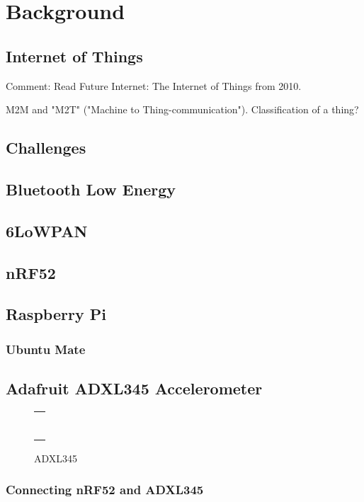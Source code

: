 \chapter{Background}
\label{chp:background} 


\section{Internet of Things}

Comment: Read Future Internet: The Internet of Things from 2010.  \cite{gubbi2013internet}

M2M and "M2T" ("Machine to Thing-communication"). Classification of a thing? \cite{tan2010future}

\section{Challenges}

\section{Bluetooth Low Energy}

\section{6LoWPAN}

\section{nRF52}

\section{Raspberry Pi}

\subsection{Ubuntu Mate}

\section{Adafruit ADXL345 Accelerometer}

\begin{figure}
\centering
\begin{tabular}{@{}c@{}}
\rule{.5\textwidth}{.5\textwidth} \\
\end{tabular}
\caption{\label{fig:ADXL345.png}ADXL345}
\end{figure}

\subsection{Connecting nRF52 and ADXL345}




